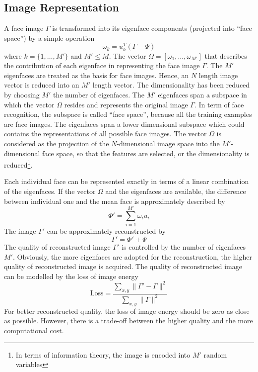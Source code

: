 \subsection{Image Representation}
A face image $\Gamma$ is transformed into its eigenface components (projected into ``face space'') by a simple operation
\begin{equation}
 \omega_k = u_k^T(\Gamma - \Psi)
\end{equation}
where $k=\{1,\ldots,M'\}$ and $M' \le M$. The vector $\Omega = [\omega_1,\ldots,\omega_{M'}]$ that describes the contribution of each eigenface in representing the face image $\Gamma$. The $M'$ eigenfaces are treated as the basis for face images. Hence, an $N$ length image vector is reduced into an $M'$ length vector. The dimensionality has been reduced by choosing $M'$ the number of eigenfaces. The $M'$ eigenfaces span a subspace in which the vector $\Omega$ resides and represents the original image $\Gamma$. In term of face recognition, the subspace is called ``face space'', because all the training examples are face images. The eigenfaces span a lower dimensional subspace which could contains the representations of all possible face images. The vector $\Omega$ is considered as the projection of the $N$-dimensional image space into the $M'$-dimensional face space, so that the features are selected, or the dimensionality is reduced\footnote{In terms of information theory, the image is encoded into $M'$ random variables}.

Each individual face can be represented exactly in terms of a linear combination of the eigenfaces. If the vector $\Omega$ and the eigenfaces are available, the difference between individual one and the mean face is approximately described by
\begin{equation}
 \Phi' = \sum_{i=1}^{M'} \omega_i u_i
\end{equation}
The image $\Gamma'$ can be approximately reconstructed by
\begin{equation}
 \Gamma' = \Phi' + \Psi
\end{equation}
The quality of reconstructed image $\Gamma'$ is controlled by the number of eigenfaces $M'$. Obviously, the more eigenfaces are adopted for the reconstruction, the higher quality of reconstructed image is acquired. The quality of reconstructed image can be modelled by the loss of image energy
\begin{equation}
 \mathrm{Loss} = \frac{\sum_{x,y}\|\Gamma'-\Gamma\|^2}{\sum_{x,y}\|\Gamma\|^2}
\end{equation}
For better reconstructed quality, the loss of image energy should be zero as close as possible. However, there is a trade-off between the higher quality and the more computational cost. 


